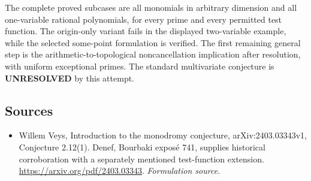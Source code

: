 \documentclass[11pt]{article}
\begin{document}
The complete proved subcases are all monomials in arbitrary dimension and all one-variable rational polynomials, for every prime and every permitted test function. The origin-only variant fails in the displayed two-variable example, while the selected some-point formulation is verified. The first remaining general step is the arithmetic-to-topological noncancellation implication after resolution, with uniform exceptional primes. The standard multivariate conjecture is \textbf{UNRESOLVED} by this attempt.

\subsection{Sources}
\begin{itemize}
\item[S1]Willem Veys, Introduction to the monodromy conjecture, arXiv:2403.03343v1, Conjecture 2.12(1). Denef, Bourbaki exposé 741, supplies historical corroboration with a separately mentioned test-function extension.
\url{https://arxiv.org/pdf/2403.03343}.
\textit{Formulation source.}
\end{itemize}
\end{document}
